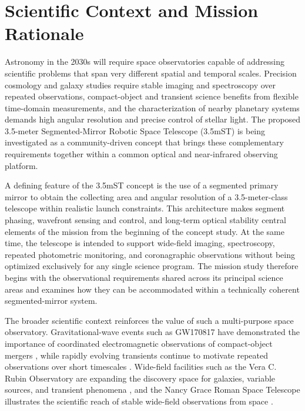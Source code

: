 \chapter{Scientific Context and Mission Rationale}
\label{chap:introduction}

Astronomy in the 2030s will require space observatories capable of addressing scientific problems that span very different spatial and temporal scales. Precision cosmology and galaxy studies require stable imaging and spectroscopy over repeated observations, compact-object and transient science benefits from flexible time-domain measurements, and the characterization of nearby planetary systems demands high angular resolution and precise control of stellar light. The proposed 3.5-meter Segmented-Mirror Robotic Space Telescope (3.5mST) is being investigated as a community-driven concept that brings these complementary requirements together within a common optical and near-infrared observing platform.

A defining feature of the 3.5mST concept is the use of a segmented primary mirror to obtain the
collecting area and angular resolution of a 3.5-meter-class telescope within realistic launch constraints. This architecture makes segment phasing, wavefront sensing and control, and long-term optical stability central elements of the mission from the beginning of the concept study. At the same time, the telescope is intended to support wide-field imaging, spectroscopy, repeated photometric monitoring, and coronagraphic observations without being optimized exclusively for any single science program. The mission study therefore begins with the observational requirements shared across its principal science areas and examines how they can be accommodated within a technically coherent segmented-mirror system.

The broader scientific context reinforces the value of such a multi-purpose space observatory.
Gravitational-wave events such as GW170817 have demonstrated the importance of coordinated
electromagnetic observations of compact-object mergers \cite{abbott2017}, while rapidly evolving transients continue to motivate repeated observations over short timescales  \cite{margutti2019}. Wide-field facilities such as the Vera C. Rubin Observatory are expanding the discovery space for galaxies, variable sources, and transient phenomena \cite{ivezic2019}, and the Nancy Grace Roman Space Telescope illustrates the scientific reach of stable wide-field observations from space \cite{roman2026}. 

